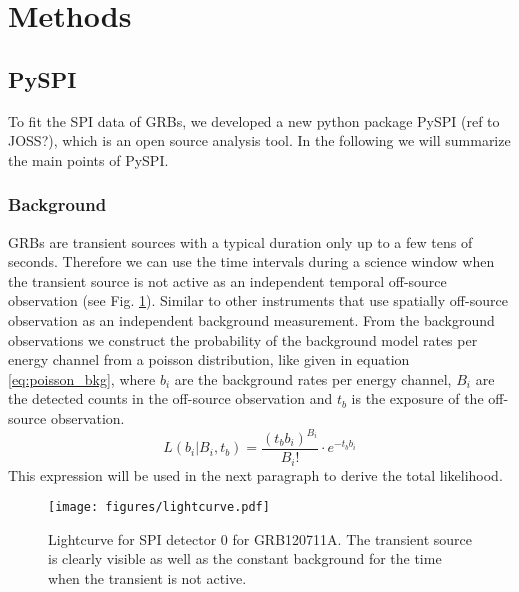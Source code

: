 \documentclass[twocolumn]{aa}
\begin{document}
\section{Methods}
\subsection{PySPI}
\label{pyspi}
To fit the SPI data of GRBs, we developed a new python package PySPI (ref to JOSS?), which is an open source analysis tool. In the following we will summarize the main points of PySPI.

\subsubsection*{Background}

GRBs are transient sources with a typical duration only up to a few tens of seconds.
Therefore we can use the time intervals during a science window when the transient source is not active as an independent temporal off-source observation (see Fig. \ref{fig:lightcurve}). Similar to other instruments that use spatially off-source observation as an independent background measurement. From the background observations we construct the probability of the background model rates per energy channel from a poisson distribution, like given in equation \ref{eq:poisson_bkg}, where $b_{i}$ are the background rates per energy channel, $B_{i}$ are the detected counts in the off-source observation and $t_{b}$ is the exposure of the off-source observation.
\begin{equation}
	L(b_{i}|B_{i}, t_{b})=\frac{(t_{b} b_{i})^{B_{i}}}{B_{i}!}\cdot e^{-t_{b} b_{i}}
  \label{eq:poisson_bkg}
\end{equation}
This expression will be used in the next paragraph to derive the total likelihood.

\begin{figure}
    \begin{centering}
        \texttt{[image: figures/lightcurve.pdf]}
        \caption{Lightcurve for SPI detector 0 for GRB120711A. The transient source is clearly visible as well as the constant background for the time when the transient is not active.}
        \label{fig:lightcurve}
    \end{centering}
\end{figure}
\end{document}
